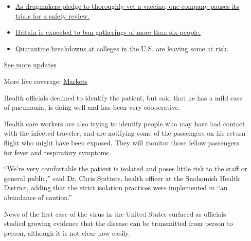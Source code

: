 \begin{itemize}
\tightlist
\item
  \href{https://www.nytimes3xbfgragh.onion/2020/09/09/world/covid-19-coronavirus.html?action=click\&pgtype=Article\&state=default\&region=MAIN_CONTENT_1\&context=storylines_live_updates\#link-70cea8bb}{As
  drugmakers pledge to thoroughly vet a vaccine, one company pauses its
  trials for a safety review.}
\item
  \href{https://www.nytimes3xbfgragh.onion/2020/09/09/world/covid-19-coronavirus.html?action=click\&pgtype=Article\&state=default\&region=MAIN_CONTENT_1\&context=storylines_live_updates\#link-780eaa2f}{Britain
  is expected to ban gatherings of more than six people.}
\item
  \href{https://www.nytimes3xbfgragh.onion/2020/09/09/world/covid-19-coronavirus.html?action=click\&pgtype=Article\&state=default\&region=MAIN_CONTENT_1\&context=storylines_live_updates\#link-11cec4c0}{Quarantine
  breakdowns at colleges in the U.S. are leaving some at risk.}
\end{itemize}

\href{https://www.nytimes3xbfgragh.onion/2020/09/09/world/covid-19-coronavirus.html?action=click\&pgtype=Article\&state=default\&region=MAIN_CONTENT_1\&context=storylines_live_updates}{See
more updates}

More live coverage:
\href{https://www.nytimes3xbfgragh.onion/live/2020/09/08/business/stock-market-today-coronavirus?action=click\&pgtype=Article\&state=default\&region=MAIN_CONTENT_1\&context=storylines_live_updates}{Markets}

Health officials declined to identify the patient, but said that he has
a mild case of pneumonia, is doing well and has been very cooperative.

Health care workers are also trying to identify people who may have had
contact with the infected traveler, and are notifying some of the
passengers on his return flight who might have been exposed. They will
monitor those fellow passengers for fever and respiratory symptoms.

``We're very comfortable the patient is isolated and poses little risk
to the staff or general public,'' said Dr. Chris Spitters, health
officer at the Snohomish Health District, adding that the strict
isolation practices were implemented in ``an abundance of caution.''

News of the first case of the virus in the United States surfaced as
officials studied growing evidence that the disease can be transmitted
from person to person, although it is not clear how easily.

